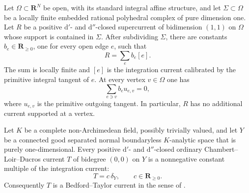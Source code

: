 \begin{lemma}
\label{lem:p213-euclidean-one-dimensional-current-revised}
Let $\Omega\subset\mathbf R^N$ be open, with its standard integral affine
structure, and let $\Sigma\subset\Omega$ be a locally finite embedded
rational polyhedral complex of pure dimension one.  Let $R$ be a positive
$\mathrm d'$- and $\mathrm d''$-closed supercurrent of bidimension $(1,1)$
on $\Omega$ whose support is contained in $\Sigma$.  After subdividing
$\Sigma$, there are constants $b_e\in\mathbf R_{\geq0}$, one for every
open edge $e$, such that
\begin{equation}
                         R=\sum_e b_e[e].
\label{eq:p213-euclidean-edge-decomposition-revised}
\end{equation}
The sum is locally finite and $[e]$ is the integration current calibrated
by the primitive integral tangent of $e$.  At every vertex $v\in\Omega$
one has
\begin{equation}
                    \sum_{e\ni v}b_eu_{e,v}=0,
\label{eq:p213-euclidean-vertex-balance-revised}
\end{equation}
where $u_{e,v}$ is the primitive outgoing tangent.  In particular, $R$
has no additional current supported at a vertex.
\end{lemma}

\begin{proposition}
\label{prop:p213-normal-curve-arbitrary-valuation-current-revised}
Let $K$ be a complete non-Archimedean field, possibly trivially valued,
and let $Y$ be a connected good separated normal boundaryless
$K$-analytic space that is purely one-dimensional.  Every positive
$\mathrm d'$- and $\mathrm d''$-closed ordinary Chambert--Loir--Ducros
current $T$ of bidegree $(0,0)$ on $Y$ is a nonnegative constant multiple
of the integration current:
\begin{equation}
                         T=c\,\delta_Y,
             \qquad c\in\mathbf R_{\geq0}.
\label{eq:p213-normal-curve-arbitrary-classification-revised}
\end{equation}
Consequently $T$ is a Bedford--Taylor current in the sense of
\cite[Definition~8.6.2]{CLD25}.
\end{proposition}



